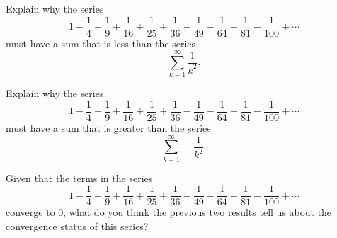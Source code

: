 \begin{activity} \label{8.4.Act4}
\ba
\item Explain why the series
\[1 - \frac{1}{4} - \frac{1}{9} + \frac{1}{16} + \frac{1}{25} + \frac{1}{36} - \frac{1}{49}  - \frac{1}{64}  - \frac{1}{81}  - \frac{1}{100}  + \cdots\]
must have a sum that is less than the series
\[\sum_{k=1}^{\infty} \frac{1}{k^2}.\]

\item Explain why the series
\[1 - \frac{1}{4} - \frac{1}{9} + \frac{1}{16} + \frac{1}{25} + \frac{1}{36} - \frac{1}{49}  - \frac{1}{64}  - \frac{1}{81}  - \frac{1}{100}  + \cdots\]
must have a sum that is greater than the series
\[\sum_{k=1}^{\infty} -\frac{1}{k^2}.\]

\item Given that the terms in the series 
\[1 - \frac{1}{4} - \frac{1}{9} + \frac{1}{16} + \frac{1}{25} + \frac{1}{36} - \frac{1}{49}  - \frac{1}{64}  - \frac{1}{81}  - \frac{1}{100}  + \cdots\]
converge to 0, what do you think the previous two results tell us about the convergence status of this series?
\ea
\end{activity}


